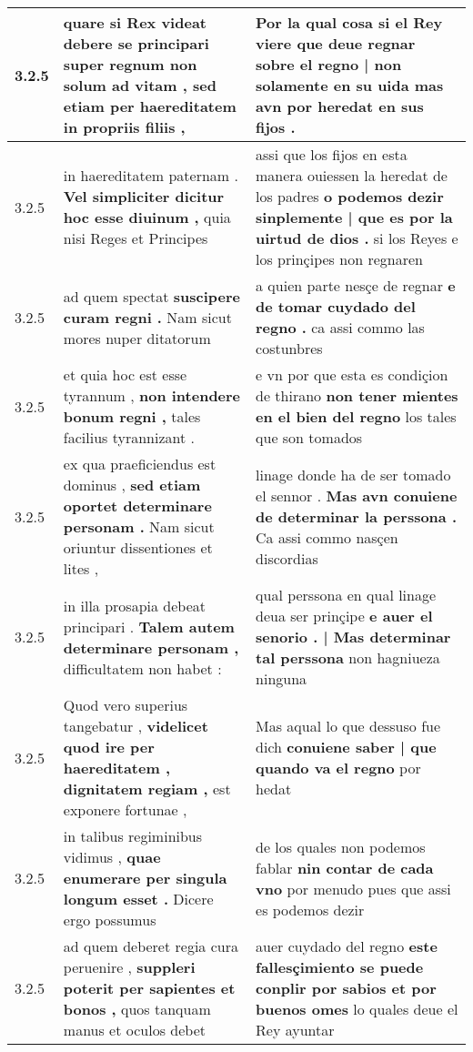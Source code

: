\begin{tabular}{|p{1cm}|p{6.5cm}|p{6.5cm}|}
3.2.5 & quare si Rex videat \textbf{ debere se principari super regnum non solum ad vitam , } sed etiam per haereditatem in propriis filiis , & Por la qual cosa si el Rey viere \textbf{ que deue regnar sobre el regno | non solamente en su uida } mas avn por heredat en sus fijos . \\\hline
3.2.5 & in haereditatem paternam . \textbf{ Vel simpliciter dicitur hoc esse diuinum , } quia nisi Reges et Principes & assi que los fijos en esta manera ouiessen la heredat de los padres \textbf{ o podemos dezir sinplemente | que es por la uirtud de dios . } si los Reyes e los prinçipes non regnaren \\\hline
3.2.5 & ad quem spectat \textbf{ suscipere curam regni . } Nam sicut mores nuper ditatorum & a quien parte nesçe de regnar \textbf{ e de tomar cuydado del regno . } ca assi commo las costunbres \\\hline
3.2.5 & et quia hoc est esse tyrannum , \textbf{ non intendere bonum regni , } tales facilius tyrannizant . & e vn por que esta es condiçion de thirano \textbf{ non tener mientes en el bien del regno } los tales que son tomados \\\hline
3.2.5 & ex qua praeficiendus est dominus , \textbf{ sed etiam oportet determinare personam . } Nam sicut oriuntur dissentiones et lites , & linage donde ha de ser tomado el sennor . \textbf{ Mas avn conuiene de determinar la perssona . } Ca assi commo nasçen discordias \\\hline
3.2.5 & in illa prosapia debeat principari . \textbf{ Talem autem determinare personam , } difficultatem non habet : & qual perssona en qual linage deua ser prinçipe \textbf{ e auer el senorio . | Mas determinar tal perssona } non hagniueza ninguna \\\hline
3.2.5 & Quod vero superius tangebatur , \textbf{ videlicet quod ire per haereditatem , dignitatem regiam , } est exponere fortunae , & Mas aqual lo que dessuso fue dich \textbf{ conuiene saber | que quando va el regno } por hedat \\\hline
3.2.5 & in talibus regiminibus vidimus , \textbf{ quae enumerare per singula longum esset . } Dicere ergo possumus & de los quales non podemos fablar \textbf{ nin contar de cada vno } por menudo pues que assi es podemos dezir \\\hline
3.2.5 & ad quem deberet regia cura peruenire , \textbf{ suppleri poterit per sapientes et bonos , } quos tanquam manus et oculos debet & auer cuydado del regno \textbf{ este fallesçimiento se puede conplir por sabios et por buenos omes } lo quales deue el Rey ayuntar \\\hline

\end{tabular}
